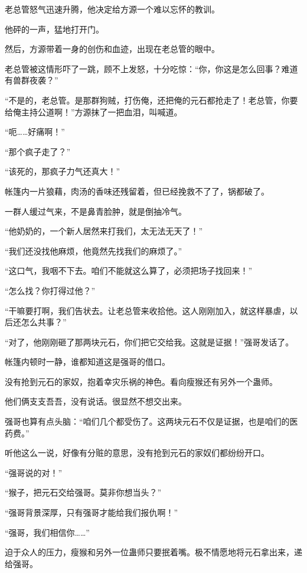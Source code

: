 
\begin{this_body}

老总管怒气迅速升腾，他决定给方源一个难以忘怀的教训。

他砰的一声，猛地打开门。

然后，方源带着一身的创伤和血迹，出现在老总管的眼中。

老总管被这情形吓了一跳，顾不上发怒，十分吃惊：“你，你这是怎么回事？难道有兽群夜袭？”

“不是的，老总管。是那群狗贼，打伤俺，还把俺的元石都抢走了！老总管，你要给俺主持公道啊！”方源抹了一把血泪，叫喊道。

“呃……好痛啊！”

“那个疯子走了？”

“该死的，那疯子力气还真大！”

帐篷内一片狼藉，肉汤的香味还残留着，但已经挽救不了了，锅都破了。

一群人缓过气来，不是鼻青脸肿，就是倒抽冷气。

“他奶奶的，一个新人居然来打我们，太无法无天了！”

“我们还没找他麻烦，他竟然先找我们的麻烦了。”

“这口气，我咽不下去。咱们不能就这么算了，必须把场子找回来！”

“怎么找？你打得过他？”

“干嘛要打啊，我们告状去。让老总管来收拾他。这人刚刚加入，就这样暴虐，以后还怎么共事？”

“对了，他刚刚砸了那两块元石，你们把它交给我。这就是证据！”强哥发话了。

帐篷内顿时一静，谁都知道这是强哥的借口。

没有抢到元石的家奴，抱着幸灾乐祸的神色。看向瘦猴还有另外一个蛊师。

他们俩支支吾吾，没有说话。很显然不想交出来。

强哥也算有点头脑：“咱们几个都受伤了。这两块元石不仅是证据，也是咱们的医药费。”

听他这么一说，好像有分赃的意思，没有抢到元石的家奴们都纷纷开口。

“强哥说的对！”

“猴子，把元石交给强哥。莫非你想当头？”

“强哥背景深厚，只有强哥才能给我们报仇啊！”

“强哥，我们相信你……”

迫于众人的压力，瘦猴和另外一位蛊师只要抿着嘴。极不情愿地将元石拿出来，递给强哥。


\end{this_body}
